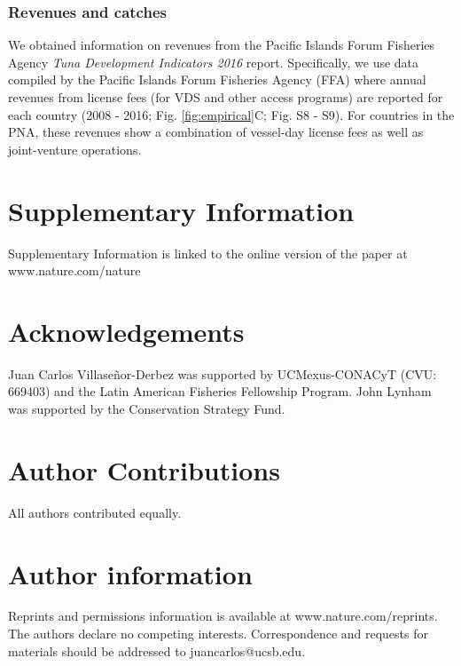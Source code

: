\documentclass[12pt]{article}
\begin{document}
\subsubsection{Revenues and catches}

We obtained information on revenues from the Pacific Islands Forum Fisheries Agency \emph{Tuna Development Indicators 2016} report.  Specifically, we use data compiled by the Pacific Islands Forum Fisheries Agency (FFA\cite{ffa_2017}) where annual revenues from license fees (for VDS and other access programs) are reported for each country (2008 - 2016; Fig. \ref{fig:empirical}C; Fig. S8 - S9). For countries in the PNA, these revenues show a combination of vessel-day license fees as well as joint-venture operations.





\section{Supplementary Information}

Supplementary Information is linked to the online version of the paper at www.nature.com/nature

\section{Acknowledgements}

Juan Carlos Villaseñor-Derbez was supported by UCMexus-CONACyT (CVU: 669403) and the Latin American Fisheries Fellowship Program. John Lynham was supported by the Conservation Strategy Fund.

\section{Author Contributions}

All authors contributed equally.

\section{Author information}

Reprints and permissions information is available at www.nature.com/reprints. The authors declare no competing interests. Correspondence and requests for materials should be addressed to juancarlos@ucsb.edu.

\clearpage

\FloatBarrier
\end{document}
